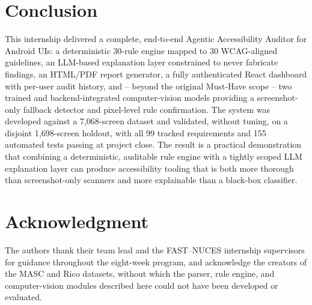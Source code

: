 \documentclass[10pt,conference]{IEEEtran}
\begin{document}
\section{Conclusion}

This internship delivered a complete, end-to-end Agentic Accessibility Auditor for Android UIs: a deterministic 30-rule engine mapped to 30 WCAG-aligned guidelines, an LLM-based explanation layer constrained to never fabricate findings, an HTML/PDF report generator, a fully authenticated React dashboard with per-user audit history, and -- beyond the original Must-Have scope -- two trained and backend-integrated computer-vision models providing a screenshot-only fallback detector and pixel-level rule confirmation. The system was developed against a 7{,}068-screen dataset and validated, without tuning, on a disjoint 1{,}698-screen holdout, with all 99 tracked requirements and 155 automated tests passing at project close. The result is a practical demonstration that combining a deterministic, auditable rule engine with a tightly scoped LLM explanation layer can produce accessibility tooling that is both more thorough than screenshot-only scanners and more explainable than a black-box classifier.

\section*{Acknowledgment}
The authors thank their team lead and the FAST--NUCES internship supervisors for guidance throughout the eight-week program, and acknowledge the creators of the MASC and Rico datasets, without which the parser, rule engine, and computer-vision modules described here could not have been developed or evaluated.
\end{document}
